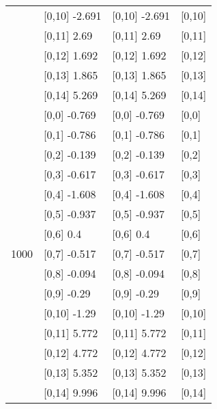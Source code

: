 \begin{table}
\begin{tabular}[t]{llll}
\addlinespace
 & {}[0,10] -2.691 & {}[0,10] -2.691 & {}[0,10]\\
 & {}[0,11] 2.69 & {}[0,11] 2.69 & {}[0,11]\\
 & {}[0,12] 1.692 & {}[0,12] 1.692 & {}[0,12]\\
 & {}[0,13] 1.865 & {}[0,13] 1.865 & {}[0,13]\\
 & {}[0,14] 5.269 & {}[0,14] 5.269 & {}[0,14]\\
\addlinespace
 & {}[0,0] -0.769 & {}[0,0] -0.769 & {}[0,0]\\
 & {}[0,1] -0.786 & {}[0,1] -0.786 & {}[0,1]\\
 & {}[0,2] -0.139 & {}[0,2] -0.139 & {}[0,2]\\
 & {}[0,3] -0.617 & {}[0,3] -0.617 & {}[0,3]\\
 & {}[0,4] -1.608 & {}[0,4] -1.608 & {}[0,4]\\
\addlinespace
 & {}[0,5] -0.937 & {}[0,5] -0.937 & {}[0,5]\\
 & {}[0,6] 0.4 & {}[0,6] 0.4 & {}[0,6]\\
1000 & {}[0,7] -0.517 & {}[0,7] -0.517 & {}[0,7]\\
 & {}[0,8] -0.094 & {}[0,8] -0.094 & {}[0,8]\\
 & {}[0,9] -0.29 & {}[0,9] -0.29 & {}[0,9]\\
\addlinespace
 & {}[0,10] -1.29 & {}[0,10] -1.29 & {}[0,10]\\
 & {}[0,11] 5.772 & {}[0,11] 5.772 & {}[0,11]\\
 & {}[0,12] 4.772 & {}[0,12] 4.772 & {}[0,12]\\
 & {}[0,13] 5.352 & {}[0,13] 5.352 & {}[0,13]\\
 & {}[0,14] 9.996 & {}[0,14] 9.996 & {}[0,14]\\
\bottomrule
\end{tabular}
\end{table}
